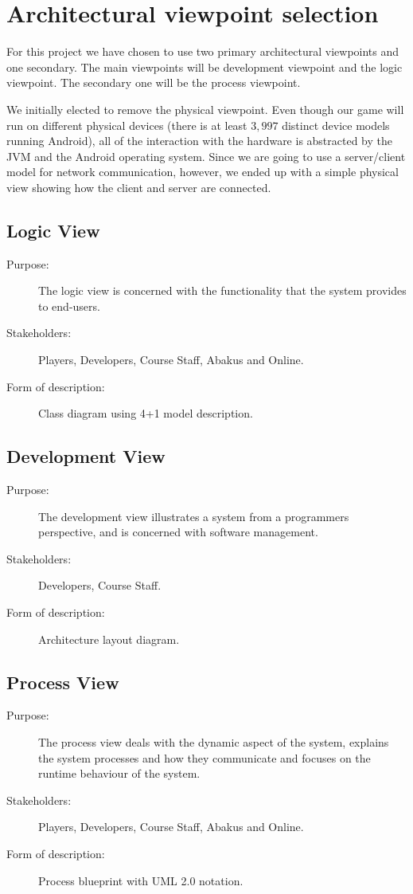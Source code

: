 \section{Architectural viewpoint selection}
\label{architecturalviewpointselection}
For this project we have chosen to use two primary architectural viewpoints and
one secondary. The main viewpoints will be development viewpoint and the logic
viewpoint. The secondary one will be the process viewpoint.

We initially elected to remove the physical viewpoint. Even though our game
will run on different physical devices (there is at least $3,997$ distinct
device models running Android\cite{website:androidfrag}), all of the
interaction with the hardware is abstracted by the JVM and the Android
operating system. Since we are going to use a server/client model for network
communication, however, we ended up with a simple physical view showing how
the client and server are connected.

\subsection{Logic View}
\begin{description}
	\item[Purpose:]{The logic view is concerned with the functionality that the
    system provides to end-users.}
	\item[Stakeholders:]{Players, Developers, Course Staff, Abakus and
    Online.}
	\item[Form of description:]{Class diagram using 4+1 model description.}
\end{description}

\subsection{Development View}
\begin{description}
	\item[Purpose:]{The development view illustrates a system from a programmers
    perspective, and is concerned with software management.}
	\item[Stakeholders:]{Developers, Course Staff.}
	\item[Form of description:]{Architecture layout diagram.}
\end{description}

\subsection{Process View}
\begin{description}
	\item[Purpose:]{The process view deals with the dynamic aspect of the system,
    explains the system processes and how they communicate and focuses on the
    runtime behaviour of the system.}
	\item[Stakeholders:]{Players, Developers, Course Staff, Abakus and Online.}
	\item[Form of description:]{Process blueprint with UML 2.0 notation.}
\end{description}

